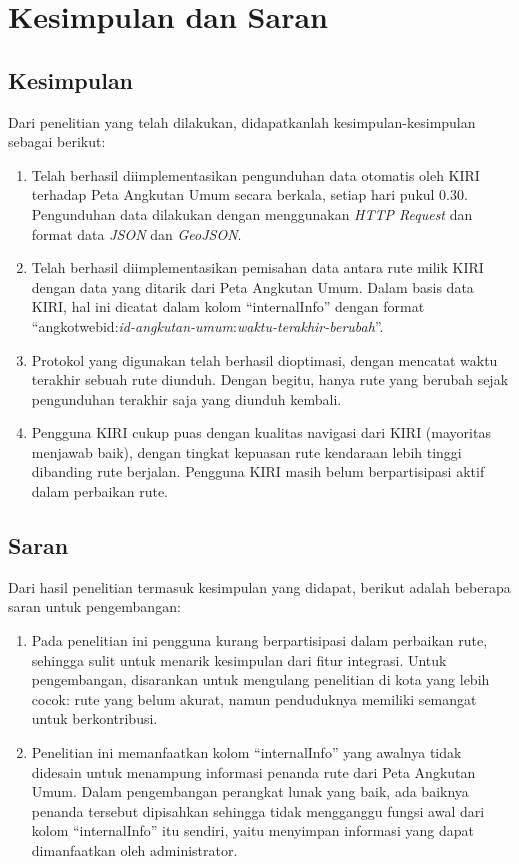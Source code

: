 \chapter{Kesimpulan dan Saran}

\section{Kesimpulan}

Dari penelitian yang telah dilakukan, didapatkanlah kesimpulan-kesimpulan sebagai berikut:

\begin{enumerate}
	\item Telah berhasil diimplementasikan pengunduhan data otomatis oleh KIRI terhadap Peta Angkutan Umum secara berkala, setiap hari pukul 0.30. Pengunduhan data dilakukan dengan menggunakan \textit{HTTP Request} dan format data \textit{JSON} dan \textit{GeoJSON}.
	\item Telah berhasil diimplementasikan pemisahan data antara rute milik KIRI dengan data yang ditarik dari Peta Angkutan Umum. Dalam basis data KIRI, hal ini dicatat dalam kolom ``internalInfo'' dengan format ``angkotwebid:\textit{id-angkutan-umum}:\textit{waktu-terakhir-berubah}''.
	\item Protokol yang digunakan telah berhasil dioptimasi, dengan mencatat waktu terakhir sebuah rute diunduh. Dengan begitu, hanya rute yang berubah sejak pengunduhan terakhir saja yang diunduh kembali.
	\item Pengguna KIRI cukup puas dengan kualitas navigasi dari KIRI (mayoritas menjawab baik), dengan tingkat kepuasan rute kendaraan lebih tinggi dibanding rute berjalan. Pengguna KIRI masih belum berpartisipasi aktif dalam perbaikan rute.
\end{enumerate}

\section{Saran}

Dari hasil penelitian termasuk kesimpulan yang didapat, berikut adalah beberapa saran untuk pengembangan:

\begin{enumerate}
	\item Pada penelitian ini pengguna kurang berpartisipasi dalam perbaikan rute, sehingga sulit untuk menarik kesimpulan dari fitur integrasi. Untuk pengembangan, disarankan untuk mengulang penelitian di kota yang lebih cocok: rute yang belum akurat, namun penduduknya memiliki semangat untuk berkontribusi.
	\item Penelitian ini memanfaatkan kolom ``internalInfo'' yang awalnya tidak didesain untuk menampung informasi penanda rute dari Peta Angkutan Umum. Dalam pengembangan perangkat lunak yang baik, ada baiknya penanda tersebut dipisahkan sehingga tidak mengganggu fungsi awal dari kolom ``internalInfo'' itu sendiri, yaitu menyimpan informasi yang dapat dimanfaatkan oleh administrator.
\end{enumerate}